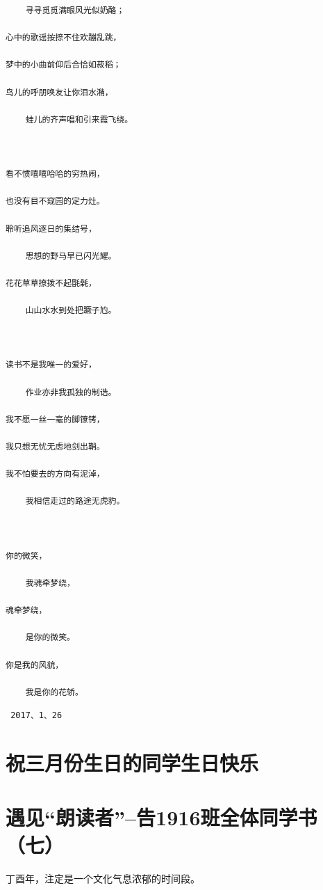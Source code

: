 \documentclass[openany]{ctexbook}
\begin{document}
\begin{verbatim}
    寻寻觅觅满眼风光似奶酪；

心中的歌谣按捺不住欢蹦乱跳，

梦中的小曲前仰后合恰如菽稻；

鸟儿的呼朋唤友让你泪水潲，

    蛙儿的齐声唱和引来霞飞绕。

 

看不惯嘻嘻哈哈的穷热闹，

也没有目不窥园的定力灶。

聆听追风逐日的集结号，

    思想的野马早已闪光耀。

花花草草撩拨不起毷氉，

    山山水水到处把蹶子尥。

 

读书不是我唯一的爱好，

    作业亦非我孤独的制诰。

我不愿一丝一毫的脚镣铐，

我只想无忧无虑地剑出鞘。

我不怕要去的方向有泥淖，

    我相信走过的路途无虎豹。

 

你的微笑，

    我魂牵梦绕，

魂牵梦绕，

    是你的微笑。

你是我的风貌，

    我是你的花轿。
\end{verbatim}

\begin{verbatim}
 2017、1、26
\end{verbatim}

\chapter*{祝三月份生日的同学生日快乐}\label{birthday3}

\chapter*{\texorpdfstring{遇见``朗读者''--告1916班全体同学书（七）}{遇见朗读者--告1916班全体同学书（七）}}\label{letter7}

丁酉年，注定是一个文化气息浓郁的时间段。
\end{document}
